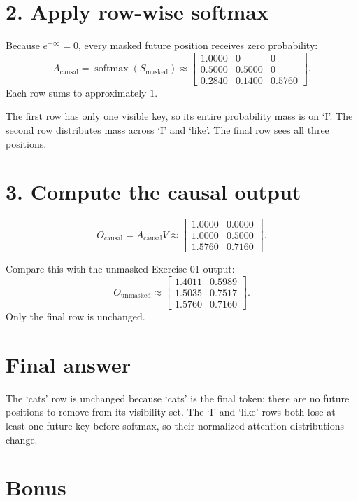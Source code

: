 \documentclass[11pt]{article}
\newcommand{\softmax}{\operatorname{softmax}}
\begin{document}
\section*{2. Apply row-wise softmax}

Because $e^{-\infty}=0$, every masked future position receives zero probability:
\[
A_{\mathrm{causal}}
=\softmax(S_{\mathrm{masked}})
\approx
\begin{bmatrix}
1.0000&0&0\\
0.5000&0.5000&0\\
0.2840&0.1400&0.5760
\end{bmatrix}.
\]
Each row sums to approximately $1$.

The first row has only one visible key, so its entire probability mass is on `I'. The second row distributes mass across `I' and `like'. The final row sees all three positions.

\section*{3. Compute the causal output}

\[
O_{\mathrm{causal}}
=A_{\mathrm{causal}}V
\approx
\begin{bmatrix}
1.0000&0.0000\\
1.0000&0.5000\\
1.5760&0.7160
\end{bmatrix}.
\]

Compare this with the unmasked Exercise 01 output:
\[
O_{\mathrm{unmasked}}
\approx
\begin{bmatrix}
1.4011&0.5989\\
1.5035&0.7517\\
1.5760&0.7160
\end{bmatrix}.
\]
Only the final row is unchanged.

\section*{Final answer}

The `cats' row is unchanged because `cats' is the final token: there are no future positions to remove from its visibility set. The `I' and `like' rows both lose at least one future key before softmax, so their normalized attention distributions change.

\section*{Bonus}
\end{document}
